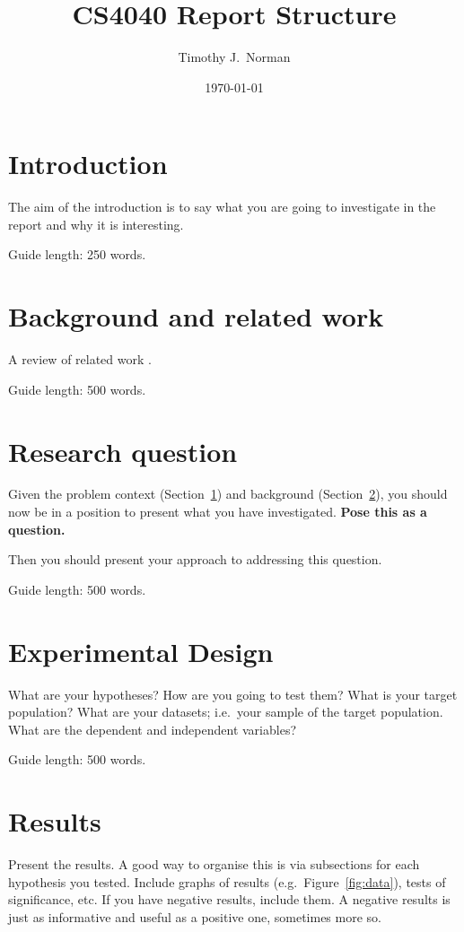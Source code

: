 \documentclass{csfourzero}
\title{CS4040 Report Structure}
\author{Timothy J.\ Norman}
\date{\today}
\begin{document}
\maketitle


\section{Introduction}
\label{sec:intro}

The aim of the introduction is to say what you are going to investigate in the report and why it
  is interesting.

Guide length: 250 words.

\section{Background and related work}
\label{sec:lit}

A review of related work \cite{p2pbookv2,Burnett,p2pwiki}.

Guide length: 500 words.

\section{Research question}
\label{sec:rq}

Given the problem context (Section~\ref{sec:intro}) and background
(Section~\ref{sec:lit}), you should now be in a position to present
what you have investigated. \textbf{Pose this as a question.}

Then you should present your approach to addressing this
question.

Guide length: 500 words.

\section{Experimental Design}
\label{sec:exp}

What are your hypotheses? How are you going to test them? What is your
target population? What are your datasets; i.e.\ your sample of the
target population. What are the dependent and independent variables?

Guide length: 500 words.

\section{Results}
\label{sec:results}

Present the results. A good way to organise this is via subsections
for each hypothesis you tested. Include graphs of results
(e.g.\ Figure~\ref{fig:data}), tests of significance, etc. If you have
negative results, include them. A negative results is just as
informative and useful as a positive one, sometimes more so.
\end{document}

